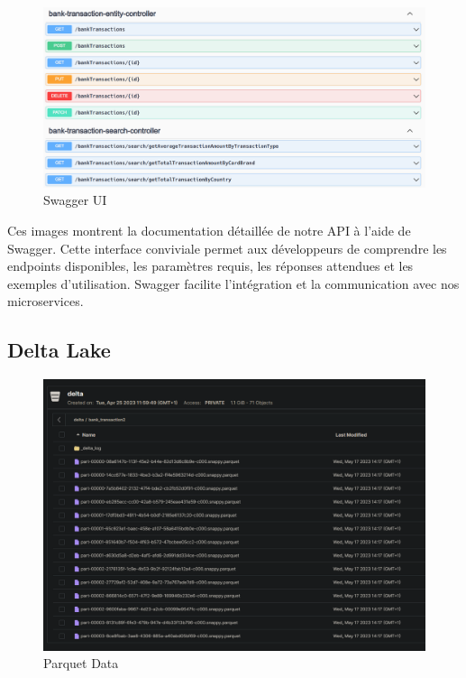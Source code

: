 \begin{figure}[H]
\centering
\includegraphics[width=\linewidth]{images/Swagger-UI-3.png}
\caption{Swagger UI}\label{fig:swagger-4}
\end{figure}

Ces images montrent la documentation détaillée de notre API à l'aide de Swagger. Cette interface conviviale permet aux développeurs de comprendre les endpoints disponibles, les paramètres requis, les réponses attendues et les exemples d'utilisation. Swagger facilite l'intégration et la communication avec nos microservices.

\subsection{Delta Lake}

\begin{figure}[H]
\centering
\includegraphics[width=\linewidth]{images/delta-lake-dossier.png}
\caption{Parquet Data}\label{fig:delta-lake-dossier}
\end{figure}

